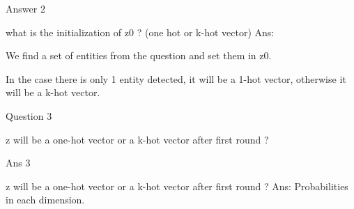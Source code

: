 \documentclass[10pt]{beamer}
\begin{document}
\begin{frame}{Answer 2}

    \begin{exampleblock}{what is the initialization of z0 ? (one hot or k-hot vector)}
        Ans: 

        We find a set of entities from the question and set them in z0. 
        
        In the case there is only 1 entity detected, it will be a 1-hot vector, otherwise it will be a k-hot vector.
    \end{exampleblock}

\end{frame}

\begin{frame}{Question 3}
    \begin{exampleblock}{z will be a one-hot vector or a k-hot vector after first round ?}
        
    \end{exampleblock}

\end{frame}


\begin{frame}{Ans 3}
    \begin{exampleblock}{z will be a one-hot vector or a k-hot vector after first round ?}
        Ans: Probabilities in each dimension.
    \end{exampleblock}

\end{frame}
\end{document}
